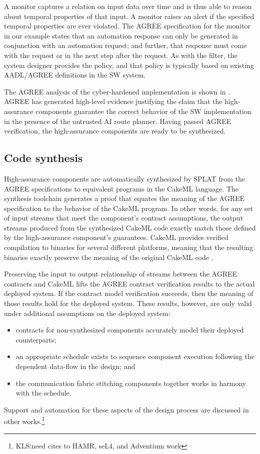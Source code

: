 A monitor captures a relation on input data over time and is thus able
to reason about temporal properties of that input.  A monitor raises
an alert if the specified temporal properties are ever violated.  The
AGREE specification for the monitor in our example states that an
automation response can only be generated in conjunction with an
automation request; and further, that response must come with the
request or in the next step after the request.  As with the filter,
the system designer provides the policy, and that policy is typically
based on existing AADL/AGREE definitions in the SW system.

The AGREE analysis of the cyber-hardened implementation is shown in
. AGREE has generated high-level
evidence justifying the claim that the high-assurance components
guarantee the correct behavior of the SW implementation in the
presence of the untrusted AI route planner.  Having passed AGREE
verification, the high-assurance components are ready to be
synthesized.

\subsection{Code synthesis}
High-assurance components are automatically synthesized by SPLAT from
the AGREE specifications to equivalent programs in the CakeML
language.  The synthesis toolchain generates a proof that equates the
meaning of the AGREE specification to the behavior of the CakeML
program.  In other words, for any set of input streams that meet the
component's contract assumptions, the output streams produced from the
synthesized CakeML code exactly match those defined by the
high-assurance component's guarantees.  CakeML provides verified
compilation to binaries for several different platforms, meaning that
the resulting binaries exactly preserve the meaning of the original
CakeML code \cite{cakeml}.

Preserving the input to output relationship of streams between the
AGREE contracts and CakeML lifts the AGREE contract verification
results to the actual deployed system.  If the contract model
verification succeeds, then the meaning of those results hold for the
deployed system.  These results, however, are only valid under
additional assumptions on the deployed system:
\begin{itemize}
\item contracts for non-synthesized components accurately model their deployed
counterparts;
\item an appropriate schedule exists to sequence component
  execution following the dependent data-flow in the design; and
\item the communication fabric stitching components together works in harmony
  with the schedule.
\end{itemize}
\noindent Support and automation for these aspects of the design process are
discussed in other works.\footnote{KLS:need cites to HAMR, seL4, and Adventium work}
